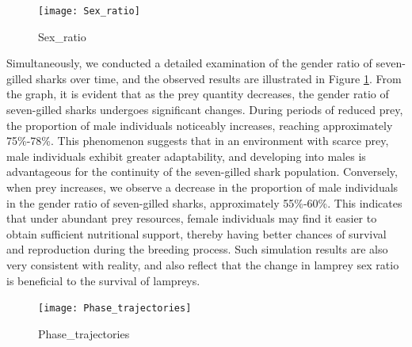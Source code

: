 \documentclass[CTeX = true]{mcmthesis}  %
\begin{document}
\begin{figure}[htbp]
       \centering    
   \texttt{[image: Sex\_ratio]}
     \caption{Sex\_ratio}
     \label{fig:Sex_ratio}
\end{figure}
Simultaneously, we conducted a detailed examination of the gender ratio of seven-gilled sharks over time, and the observed results are illustrated in Figure \ref{fig:Sex_ratio}. From the graph, it is evident that as the prey quantity decreases, the gender ratio of seven-gilled sharks undergoes significant changes. During periods of reduced prey, the proportion of male individuals noticeably increases, reaching approximately 75\%-78\%. This phenomenon suggests that in an environment with scarce prey, male individuals exhibit greater adaptability, and developing into males is advantageous for the continuity of the seven-gilled shark population. Conversely, when prey increases, we observe a decrease in the proportion of male individuals in the gender ratio of seven-gilled sharks, approximately 55\%-60\%. This indicates that under abundant prey resources, female individuals may find it easier to obtain sufficient nutritional support, thereby having better chances of survival and reproduction during the breeding process. Such simulation results are also very consistent with reality, and also reflect that the change in lamprey sex ratio is beneficial to the survival of lampreys.


\begin{figure}[htbp]
       \centering    
   \texttt{[image: Phase\_trajectories]}
     \caption{Phase\_trajectories}
     \label{fig:Phase_trajectories}
\end{figure}

\end{document}
